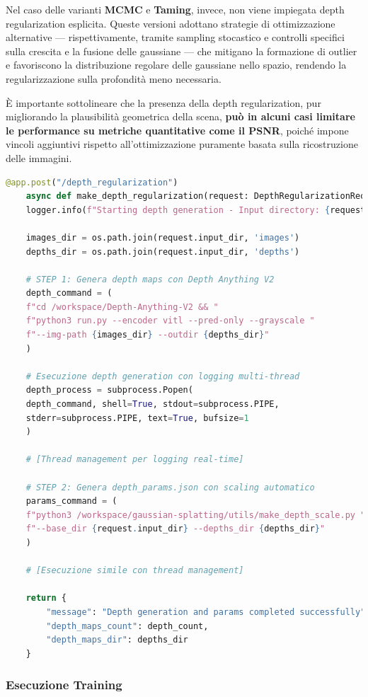 Nel caso delle varianti \textbf{MCMC} e \textbf{Taming}, invece, non viene impiegata depth regularization esplicita.
Queste versioni adottano strategie di ottimizzazione alternative — rispettivamente, tramite sampling stocastico e controlli specifici sulla crescita e la fusione delle gaussiane — che mitigano la formazione di outlier e favoriscono la distribuzione regolare delle gaussiane nello spazio, rendendo la regularizzazione sulla profondità meno necessaria.

È importante sottolineare che la presenza della depth regularization, pur migliorando la plausibilità geometrica della scena, \textbf{può in alcuni casi limitare le performance su metriche quantitative come il PSNR}, poiché impone vincoli aggiuntivi rispetto all’ottimizzazione puramente basata sulla ricostruzione delle immagini.

\begin{lstlisting}[language=python, caption=Endpoint depth regularization]
	@app.post("/depth_regularization")
	async def make_depth_regularization(request: DepthRegularizationRequest):
	logger.info(f"Starting depth generation - Input directory: {request.input_dir}")
	
	images_dir = os.path.join(request.input_dir, 'images')
	depths_dir = os.path.join(request.input_dir, 'depths')
	
	# STEP 1: Genera depth maps con Depth Anything V2
	depth_command = (
	f"cd /workspace/Depth-Anything-V2 && "
	f"python3 run.py --encoder vitl --pred-only --grayscale "
	f"--img-path {images_dir} --outdir {depths_dir}"
	)
	
	# Esecuzione depth generation con logging multi-thread
	depth_process = subprocess.Popen(
	depth_command, shell=True, stdout=subprocess.PIPE, 
	stderr=subprocess.PIPE, text=True, bufsize=1
	)
	
	# [Thread management per logging real-time]
	
	# STEP 2: Genera depth_params.json con scaling automatico
	params_command = (
	f"python3 /workspace/gaussian-splatting/utils/make_depth_scale.py "
	f"--base_dir {request.input_dir} --depths_dir {depths_dir}"
	)
	
	# [Esecuzione simile con thread management]
	
	return {
		"message": "Depth generation and params completed successfully",
		"depth_maps_count": depth_count,
		"depth_maps_dir": depths_dir
	}
\end{lstlisting}

\subsubsection{Esecuzione Training}

